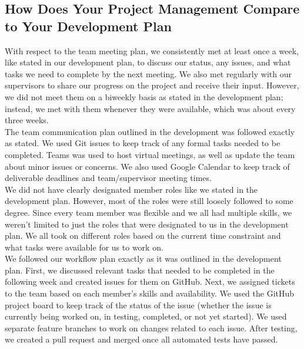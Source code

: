 \documentclass{article}
\begin{document}

\subsection{How Does Your Project Management Compare to Your Development Plan}


With respect to the team meeting plan, we consistently met at least once a week, like stated in our 
development plan, to discuss our status, any issues, and what tasks we need to complete by the next 
meeting. We also met regularly with our supervisors to share our progress on the project and receive 
their input. However, we did not meet them on a biweekly basis as stated in the development plan; 
instead, we met with them whenever they were available, which was about every three weeks.\\

The team communication plan outlined in the development was followed exactly as stated. We used Git 
issues to keep track of any formal tasks needed to be completed. Teams was used to host virtual 
meetings, as well as update the team about minor issues or concerns. We also used Google Calendar to 
keep track of deliverable deadlines and team/supervisor meeting times.\\

We did not have clearly designated member roles like we stated in the development plan. However, most 
of the roles were still loosely followed to some degree. Since every team member was flexible and we 
all had multiple skills, we weren't limited to just the roles that were designated to us in the 
development plan. We all took on different roles based on the current time constraint and what tasks 
were available for us to work on.\\

We followed our workflow plan exactly as it was outlined in the development plan. First, we discussed 
relevant tasks that needed to be completed in the following week and created issues for them on GitHub. 
Next, we assigned tickets to the team based on each member's skills and availability. We used the 
GitHub project board to keep track of the status of the issue (whether the issue is currently being 
worked on, in testing, completed, or not yet started). We used separate feature branches to work on 
changes related to each issue. After testing, we created a pull request and merged once all automated 
tests have passed.\\
\end{document}
